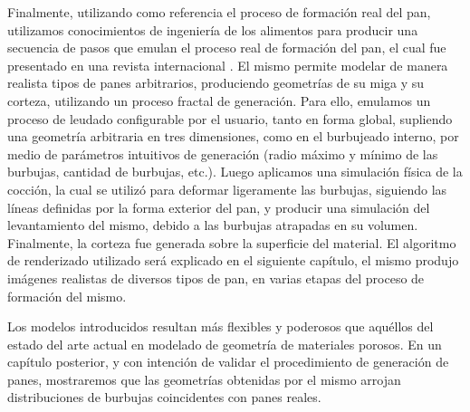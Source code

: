 Finalmente, utilizando como referencia el proceso de formación real del pan, utilizamos conocimientos de ingeniería de los alimentos para producir una secuencia de pasos que emulan el proceso real de formación del pan, el cual fue presentado en una revista internacional \cite{Baravalle2015_2}.
El mismo permite modelar de manera realista tipos de panes arbitrarios, produciendo geometrías de su miga y su corteza, utilizando un proceso fractal de generación.
Para ello, emulamos un proceso de leudado configurable por el usuario, tanto en forma global, supliendo una geometría arbitraria en tres dimensiones, como en el burbujeado interno, por medio de parámetros intuitivos de generación (radio máximo y mínimo de las burbujas, cantidad de burbujas, etc.).
Luego aplicamos una simulación física de la cocción, la cual se utilizó para deformar ligeramente las burbujas, siguiendo las líneas definidas por la forma exterior del pan, y producir una simulación del levantamiento del mismo, debido a las burbujas atrapadas en su volumen.
Finalmente, la corteza fue generada sobre la superficie del material.
El algoritmo de renderizado utilizado será explicado en el siguiente capítulo, el mismo produjo imágenes realistas de diversos tipos de pan, en varias etapas del proceso de formación del mismo.

Los modelos introducidos resultan más flexibles y poderosos que aquéllos del estado del arte actual en modelado de geometría de materiales porosos.
En un capítulo posterior, y con intención de validar el procedimiento de generación de panes, mostraremos que las geometrías obtenidas por el mismo arrojan distribuciones de burbujas coincidentes con panes reales.

